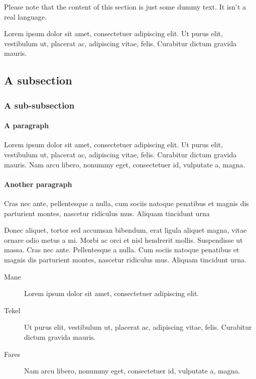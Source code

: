 Please note that the content of this section is just some dummy text. It isn't a real language.

Lorem ipsum dolor sit amet, consectetuer adipiscing elit. Ut purus elit, vestibulum ut, placerat ac, adipiscing vitae, felis. Curabitur dictum gravida mauris.

\subsection*{A subsection}

\lipsum[2]

\subsubsection*{A sub-subsection}

\lipsum[7]

\paragraph{A paragraph}
Lorem ipsum dolor sit amet, consectetuer adipiscing elit. Ut purus elit, vestibulum ut, placerat ac, adipiscing vitae, felis. Curabitur dictum gravida mauris. Nam arcu libero, nonummy eget, consectetuer id, vulputate a, magna.

\paragraph{Another paragraph}
Cras nec ante, pellentesque a nulla, cum sociis natoque penatibus et magnis dis parturient montes, nascetur ridiculus mus. Aliquam tincidunt urna

\bigskip

Donec aliquet, tortor sed accumsan bibendum, erat ligula aliquet magna, vitae ornare odio metus a mi. Morbi ac orci et nisl hendrerit mollis. Suspendisse ut massa. Cras nec ante. Pellentesque a nulla. Cum sociis natoque penatibus et magnis dis parturient montes, nascetur ridiculus mus. Aliquam tincidunt urna.

\begin{description}
\item[Mane] Lorem ipsum dolor sit amet, consectetuer adipiscing elit.
\item[Tekel] Ut purus elit, vestibulum ut, placerat ac, adipiscing vitae, felis. Curabitur dictum gravida mauris.
\item[Fares] Nam arcu libero, nonummy eget, consectetuer
id, vulputate a, magna.
\end{description}

